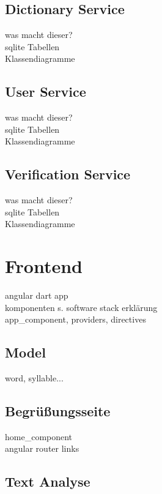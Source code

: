\subsection{Dictionary Service}

was macht dieser?\\
sqlite Tabellen\\
Klassendiagramme\\

\subsection{User Service}
was macht dieser?\\
sqlite Tabellen\\
Klassendiagramme\\

\subsection{Verification Service}
was macht dieser?\\
sqlite Tabellen\\
Klassendiagramme\\


\section{Frontend}

angular dart app\\
komponenten s. software stack erklärung\\

app\_component, providers, directives\\

\subsection{Model}
word, syllable...

\subsection{Begrüßungsseite}

home\_component\\
angular router links

\subsection{Text Analyse}

